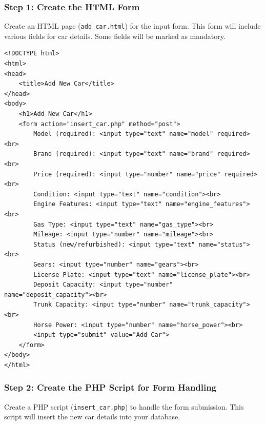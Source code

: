 \documentclass[11pt]{article}
\begin{document}
\subsubsection{Step 1: Create the HTML Form}
\label{sec:org7d6bf5f}
Create an HTML page (\texttt{add\_car.html}) for the input form. This form will
include various fields for car details. Some fields will be marked as
mandatory.

\begin{verbatim}
<!DOCTYPE html>
<html>
<head>
    <title>Add New Car</title>
</head>
<body>
    <h1>Add New Car</h1>
    <form action="insert_car.php" method="post">
        Model (required): <input type="text" name="model" required><br>
        Brand (required): <input type="text" name="brand" required><br>
        Price (required): <input type="number" name="price" required><br>
        Condition: <input type="text" name="condition"><br>
        Engine Features: <input type="text" name="engine_features"><br>
        Gas Type: <input type="text" name="gas_type"><br>
        Mileage: <input type="number" name="mileage"><br>
        Status (new/refurbished): <input type="text" name="status"><br>
        Gears: <input type="number" name="gears"><br>
        License Plate: <input type="text" name="license_plate"><br>
        Deposit Capacity: <input type="number" name="deposit_capacity"><br>
        Trunk Capacity: <input type="number" name="trunk_capacity"><br>
        Horse Power: <input type="number" name="horse_power"><br>
        <input type="submit" value="Add Car">
    </form>
</body>
</html>
\end{verbatim}

\subsubsection{Step 2: Create the PHP Script for Form Handling}
\label{sec:org17903ce}
Create a PHP script (\texttt{insert\_car.php}) to handle the form submission.
This script will insert the new car details into your database.
\end{document}
